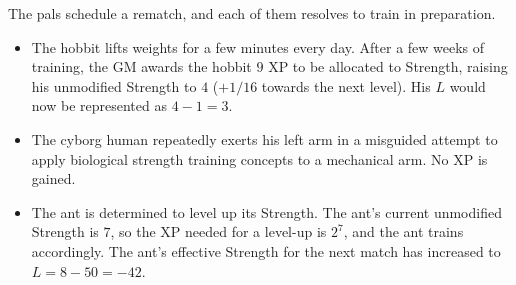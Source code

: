 \begin{example}
The pals schedule a rematch, and each of them resolves to train in preparation.
\begin{itemize}
\item
The hobbit lifts weights for a few minutes every day.
After a few weeks of training,
the GM awards the hobbit $9$ XP to be allocated to Strength, raising his unmodified Strength to $4$ ($+1/16$ towards the next level).
His $L$ would now be represented as $4-1=3$.
\item
The cyborg human repeatedly exerts his left arm in a misguided attempt to apply biological strength training concepts to a mechanical arm.
No XP is gained.
\item
The ant is determined to level up its Strength.
The ant’s current unmodified Strength is $7$, so the XP needed for a level-up is $2^7$, and the ant trains accordingly.
The ant’s effective Strength for the next match has increased to $L=8-50=-42$.
\end{itemize}
\end{example}
